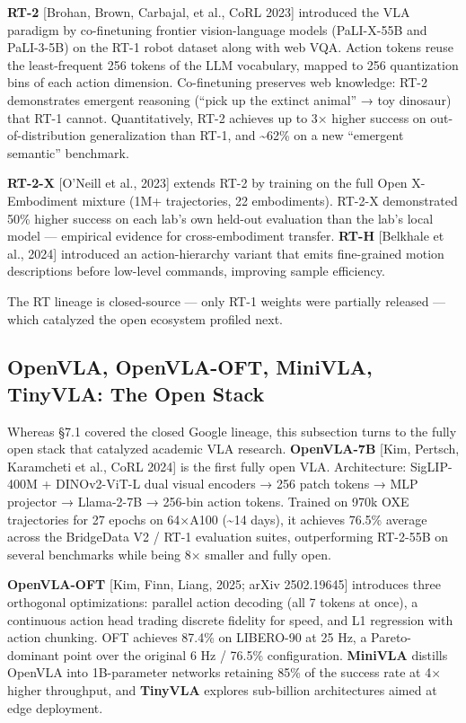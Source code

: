\textbf{RT-2} {[}Brohan, Brown, Carbajal, et al., CoRL 2023{]} introduced the VLA paradigm by co-finetuning frontier vision-language models (PaLI-X-55B and PaLI-3-5B) on the RT-1 robot dataset along with web VQA. Action tokens reuse the least-frequent 256 tokens of the LLM vocabulary, mapped to 256 quantization bins of each action dimension. Co-finetuning preserves web knowledge: RT-2 demonstrates emergent reasoning (``pick up the extinct animal'' → toy dinosaur) that RT-1 cannot. Quantitatively, RT-2 achieves up to 3× higher success on out-of-distribution generalization than RT-1, and \textasciitilde62\% on a new ``emergent semantic'' benchmark.

\textbf{RT-2-X} {[}O'Neill et al., 2023{]} extends RT-2 by training on the full Open X-Embodiment mixture (1M+ trajectories, 22 embodiments). RT-2-X demonstrated 50\% higher success on each lab's own held-out evaluation than the lab's local model --- empirical evidence for cross-embodiment transfer. \textbf{RT-H} {[}Belkhale et al., 2024{]} introduced an action-hierarchy variant that emits fine-grained motion descriptions before low-level commands, improving sample efficiency.

The RT lineage is closed-source --- only RT-1 weights were partially released --- which catalyzed the open ecosystem profiled next.

\subsection{OpenVLA, OpenVLA-OFT, MiniVLA, TinyVLA: The Open Stack}\label{openvla-openvla-oft-minivla-tinyvla-the-open-stack}

Whereas §7.1 covered the closed Google lineage, this subsection turns to the fully open stack that catalyzed academic VLA research. \textbf{OpenVLA-7B} {[}Kim, Pertsch, Karamcheti et al., CoRL 2024{]} is the first fully open VLA. Architecture: SigLIP-400M + DINOv2-ViT-L dual visual encoders → 256 patch tokens → MLP projector → Llama-2-7B → 256-bin action tokens. Trained on 970k OXE trajectories for 27 epochs on 64×A100 (\textasciitilde14 days), it achieves 76.5\% average across the BridgeData V2 / RT-1 evaluation suites, outperforming RT-2-55B on several benchmarks while being 8× smaller and fully open.

\textbf{OpenVLA-OFT} {[}Kim, Finn, Liang, 2025; arXiv 2502.19645{]} introduces three orthogonal optimizations: parallel action decoding (all 7 tokens at once), a continuous action head trading discrete fidelity for speed, and L1 regression with action chunking. OFT achieves 87.4\% on LIBERO-90 at 25 Hz, a Pareto-dominant point over the original 6 Hz / 76.5\% configuration. \textbf{MiniVLA} distills OpenVLA into 1B-parameter networks retaining 85\% of the success rate at 4× higher throughput, and \textbf{TinyVLA} explores sub-billion architectures aimed at edge deployment.

